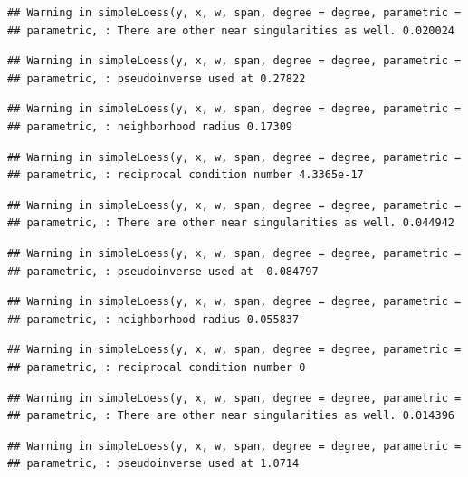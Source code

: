 \documentclass[]{article}
\begin{document}
\begin{verbatim}
## Warning in simpleLoess(y, x, w, span, degree = degree, parametric =
## parametric, : There are other near singularities as well. 0.020024
\end{verbatim}

\begin{verbatim}
## Warning in simpleLoess(y, x, w, span, degree = degree, parametric =
## parametric, : pseudoinverse used at 0.27822
\end{verbatim}

\begin{verbatim}
## Warning in simpleLoess(y, x, w, span, degree = degree, parametric =
## parametric, : neighborhood radius 0.17309
\end{verbatim}

\begin{verbatim}
## Warning in simpleLoess(y, x, w, span, degree = degree, parametric =
## parametric, : reciprocal condition number 4.3365e-17
\end{verbatim}

\begin{verbatim}
## Warning in simpleLoess(y, x, w, span, degree = degree, parametric =
## parametric, : There are other near singularities as well. 0.044942
\end{verbatim}

\begin{verbatim}
## Warning in simpleLoess(y, x, w, span, degree = degree, parametric =
## parametric, : pseudoinverse used at -0.084797
\end{verbatim}

\begin{verbatim}
## Warning in simpleLoess(y, x, w, span, degree = degree, parametric =
## parametric, : neighborhood radius 0.055837
\end{verbatim}

\begin{verbatim}
## Warning in simpleLoess(y, x, w, span, degree = degree, parametric =
## parametric, : reciprocal condition number 0
\end{verbatim}

\begin{verbatim}
## Warning in simpleLoess(y, x, w, span, degree = degree, parametric =
## parametric, : There are other near singularities as well. 0.014396
\end{verbatim}

\begin{verbatim}
## Warning in simpleLoess(y, x, w, span, degree = degree, parametric =
## parametric, : pseudoinverse used at 1.0714
\end{verbatim}
\end{document}
